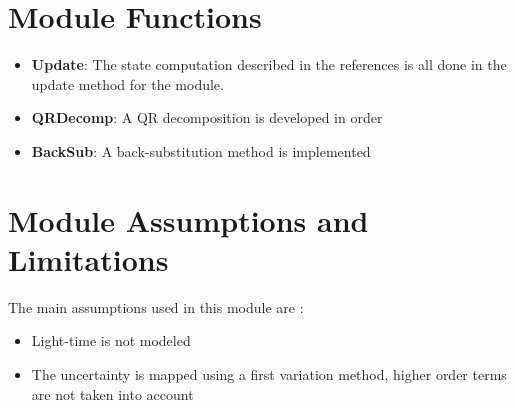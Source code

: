 

\section{Module Functions}
\begin{itemize}
	\item \textbf{Update}: The state computation described in the references is all done in the update method for the module.
	\item \textbf{QRDecomp}: A QR decomposition is developed in order
	\item \textbf{BackSub}: A back-substitution method is implemented
\end{itemize}

\section{Module Assumptions and Limitations}

The main assumptions used in this module are :

\begin{itemize}
\item Light-time is not modeled
\item The uncertainty is mapped using a first variation method, higher order terms are not taken into account
\end{itemize}
